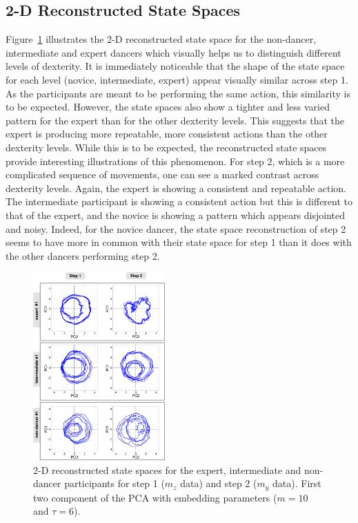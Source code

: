 \documentclass[10pt,journal,compsoc]{IEEEtran}
\begin{document}
\subsection{2-D Reconstructed State Spaces}

Figure~\ref{fig:skills} illustrates the 2-D reconstructed state space for the 
non-dancer, intermediate and expert dancers which visually 
helps us to distinguish different levels of dexterity. It is 
immediately noticeable that the shape of the state space 
for each level (novice, intermediate, expert) appear visually 
similar across step 1. As the participants are meant to be 
performing the same action, this similarity is to be expected.
However, the state spaces also show a tighter and less varied 
pattern for the expert than for the other dexterity levels. This 
suggests that the expert is producing more repeatable, more 
consistent actions than the other dexterity levels. While this 
is to be expected, the reconstructed state spaces provide 
interesting illustrations of this phenomenon.  For step 2, 
which is a more complicated sequence of movements, one 
can see a marked contrast across dexterity levels. Again, the 
expert is showing a consistent and repeatable action. The 
intermediate participant is showing a consistent action but 
this is different to that of the expert, and the novice is showing 
a pattern which appears disjointed and noisy. Indeed, 
for the novice dancer, the state space reconstruction of step 2 
seems to have more in common with their state space for 
step 1 than it does with the other dancers performing step 2.  
\begin{figure}[!htb]
  \centering
  \includegraphics[width=0.45\textwidth]{rss00}
  \caption[PA]{2-D reconstructed state spaces for the expert, intermediate and
  non-dancer participants for step 1 ($m_z$ data) and step 2 ($m_y$ data).
  First two component of the PCA with embedding parameters ($m = 10$ and $\tau = 6$).}
  \label{fig:skills}
\end{figure}
\end{document}
